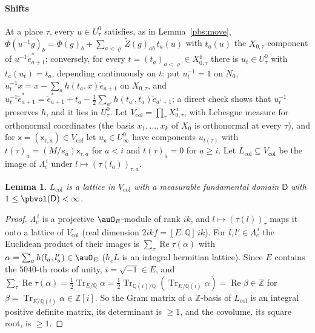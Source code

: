 \documentclass[10pt]{amsart}
\newtheorem{lemma}[theorem]{Lemma}
\theoremstyle{definition}
\theoremstyle{remark}
\newcommand{\Z}{\mathbb Z}
\newcommand{\Q}{\mathbb Q}
\begin{document}
\paragraph*{Shifts}
At a place $\tau$, every $u\in U^0_\tau$ satisfies, as in Lemma~\ref{pbs:move}, $\Phi(u^{-1}g)_b=\Phi(
g)_b+\sum_{a<\varrho}\tilde Z(g)_{ab}\,t_a(u)$ with $t_a(u)$ the $X_{0,\tau}$-component of $u^{-1}\tilde
e^*_{a+1}$; conversely, for every $t=(t_a)_{a<\varrho}\in X_{0,\tau}^\varrho$ there is $u_t\in U^0_\tau$ with
$t_a(u_t)=t_a$, depending continuously on $t$: put $u_t^{-1}=1$ on $N_0$, $u_t^{-1}x=x-\sum_ah(t_a,x)\tilde
e_{a+1}$ on $X_{0,\tau}$, and $u_t^{-1}\tilde e^*_{a+1}=\tilde e^*_{a+1}+t_a-\frac12\sum_{a'}h(t_{a'},t_a)
\tilde e_{a'+1}$; a direct check shows that $u_t^{-1}$ preserves $h$, and it lies in $U^0_\tau$. Let
$V_{\mathrm{col}}=\prod_\tau X_{0,\tau}^{\,i}$, with Lebesgue measure for orthonormal coordinates
(the basis $x_1,\dots,x_k$ of $X_0$ is orthonormal at every $\tau$), and for $\mathsf x=(\mathsf x_{\tau,
a})\in V_{\mathrm{col}}$ let $u_{\mathsf x}\in U^0_\infty$ have components $u_{t(\tau)}$ with $t(\tau)_a=
(M/s_a)\mathsf x_{\tau,a}$ for $a<i$ and $t(\tau)_a=0$ for $a\ge i$. Let $L_{\mathrm{col}}\subseteq
V_{\mathrm{col}}$ be the image of $\Lambda_c^{\,i}$ under $l\mapsto(\tau(l_a))_{\tau,a}$.

\begin{lemma}\label{pbs:col}
$L_{\mathrm{col}}$ is a lattice in $V_{\mathrm{col}}$ with a measurable fundamental domain $\mathsf D$
with $1\le\pbvol(\mathsf D)<\infty$.
\end{lemma}
\begin{proof}
$\Lambda_c^{\,i}$ is a projective $\auO_E$-module of rank $ik$, and $l\mapsto(\tau(l))_\tau$ maps it onto a
lattice of $V_{\mathrm{col}}$ (real dimension $2ikf=[E:\Q]\,ik$). For $l,l'\in\Lambda_c^{\,i}$ the
Euclidean product of their images is $\sum_\tau\operatorname{Re}\tau(\alpha)$ with $\alpha=\sum_ah(l_a,
l'_a)\in\auO_E$ ($h_cL$ is an integral hermitian lattice). Since $E$ contains the $5040$-th roots of
unity, $i=\sqrt{-1}\in E$, and $\sum_\tau\operatorname{Re}\tau(\alpha)=\frac12\operatorname{Tr}_{E/\Q}
\alpha=\frac12\operatorname{Tr}_{\Q(i)/\Q}(\operatorname{Tr}_{E/\Q(i)}\alpha)=\operatorname{Re}\beta\in
\Z$ for $\beta=\operatorname{Tr}_{E/\Q(i)}\alpha\in\Z[i]$. So the Gram matrix of a $\Z$-basis of
$L_{\mathrm{col}}$ is an integral positive definite matrix, its determinant is $\ge1$, and the
covolume, its square root, is $\ge1$.
\end{proof}
\end{document}
